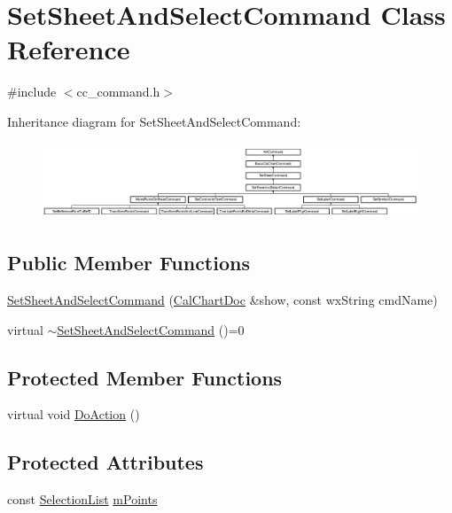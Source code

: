 \hypertarget{a00132}{\section{Set\-Sheet\-And\-Select\-Command Class Reference}
\label{a00132}
}


{\ttfamily \#include $<$cc\-\_\-command.\-h$>$}

Inheritance diagram for Set\-Sheet\-And\-Select\-Command\-:\begin{figure}[H]
\begin{center}
\leavevmode
\includegraphics[height=2.296651cm]{a00132}
\end{center}
\end{figure}
\subsection*{Public Member Functions}
\begin{DoxyCompactItemize}
\item 
\hyperlink{a00132_ad6581170d9c9752c151c99d98c59bec8}{Set\-Sheet\-And\-Select\-Command} (\hyperlink{a00020}{Cal\-Chart\-Doc} \&show, const wx\-String cmd\-Name)
\item 
virtual \hyperlink{a00132_a07bab9a5d540717f5046c244e0054219}{$\sim$\-Set\-Sheet\-And\-Select\-Command} ()=0
\end{DoxyCompactItemize}
\subsection*{Protected Member Functions}
\begin{DoxyCompactItemize}
\item 
virtual void \hyperlink{a00132_ae017079a0a6c65222f10968fad8fc082}{Do\-Action} ()
\end{DoxyCompactItemize}
\subsection*{Protected Attributes}
\begin{DoxyCompactItemize}
\item 
const \hyperlink{a00214_aaec86d4bb87e1e6f0b60e6e551c5e570}{Selection\-List} \hyperlink{a00132_aca82abd26c7fb4cdf0b6329b5fecdb42}{m\-Points}
\end{DoxyCompactItemize}


